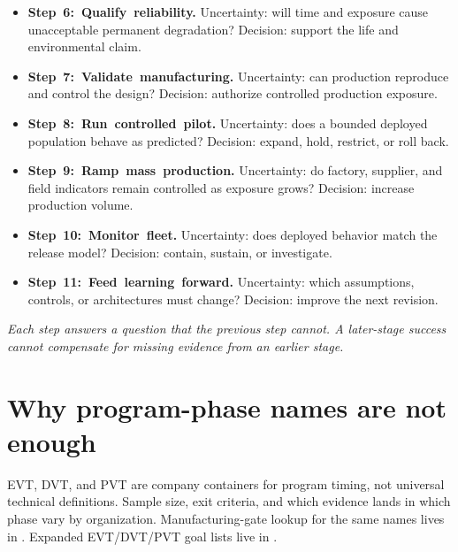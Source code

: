 {\begin{minipage}{\dimexpr\textwidth-2\fboxsep-2\fboxrule\relax}
{\begin{itemize}
      ready for unrestricted production.
\item \mbox{\textbf{Step 6: Qualify reliability.}} Uncertainty: will time and
      exposure cause unacceptable permanent degradation? Decision: support the
      life and environmental claim.
\item \mbox{\textbf{Step 7: Validate manufacturing.}} Uncertainty: can
      production reproduce and control the design? Decision: authorize
      controlled production exposure.
\item \mbox{\textbf{Step 8: Run controlled pilot.}} Uncertainty: does a bounded
      deployed population behave as predicted? Decision: expand, hold,
      restrict, or roll back.
\item \mbox{\textbf{Step 9: Ramp mass production.}} Uncertainty: do factory,
      supplier, and field indicators remain controlled as exposure grows?
      Decision: increase production volume.
\item \mbox{\textbf{Step 10: Monitor fleet.}} Uncertainty: does deployed
      behavior match the release model? Decision: contain, sustain, or
      investigate.
\item \mbox{\textbf{Step 11: Feed learning forward.}} Uncertainty: which
      assumptions, controls, or architectures must change? Decision: improve
      the next revision.
\end{itemize}
\textit{Each step answers a question that the previous step cannot. A
later-stage success cannot compensate for missing evidence from an earlier
stage.}\par}
\end{minipage}%
}%
\endgraf\medskip

\section{Why program-phase names are not enough}
\label{sec:phase-labels}

EVT,
DVT,
and PVT
are company containers for program timing, not universal technical
definitions. Sample size, exit criteria, and which evidence lands in which
phase vary by organization. Manufacturing-gate lookup for the same names lives
in . Expanded EVT/DVT/PVT goal lists live in
.

